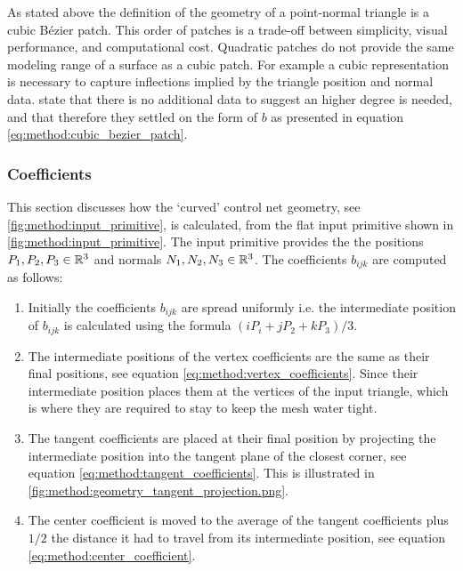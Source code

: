 As stated above the definition of the geometry of a point-normal triangle is a cubic Bézier patch. This order of patches is a trade-off between simplicity, visual performance, and computational cost. Quadratic patches do not provide the same modeling range of a surface as a cubic patch. For example a cubic representation is necessary to capture inflections implied by the triangle position and normal data. \citeauthor{vlachos2001curved} state that there is no additional data to suggest an higher degree is needed, and that therefore they settled on the form of $b$ as presented in equation \ref{eq:method:cubic_bezier_patch}.

\subsubsection{Coefficients} \label{sss:control_point_construction}
This section discusses how the `curved' control net geometry, see \cref{fig:method:input_primitive}, is calculated, from the flat input primitive shown in \cref{fig:method:input_primitive}. The input primitive provides the the positions $P_1, P_2, P_3 \in \mathbb{R}^3$ and normals $N_1, N_2, N_3 \in \mathbb{R}^3$. The coefficients $b_{ijk}$ are computed as follows:
%
\begin{enumerate}[label=(\roman*)]
	\item 
		Initially the coefficients $b_{ijk}$ are spread uniformly i.e. the intermediate position of $b_{ijk}$ is calculated using the formula $(i P_i + j P_2 + kP_3) / 3$. 
	\item 
		The intermediate positions of the vertex coefficients are the same as their final positions, see equation \eqref{eq:method:vertex_coefficients}. Since their intermediate position places them at the vertices of the input triangle, which is where they are required to stay to keep the mesh water tight.
	\item 
		The tangent coefficients are placed at their final position by projecting the intermediate position into the tangent plane of the closest corner, see equation \eqref{eq:method:tangent_coefficients}. This is illustrated in \cref{fig:method:geometry_tangent_projection.png}.
	\item The center coefficient is moved to the average of the tangent coefficients plus $1/2$ the distance it had to travel from its intermediate position, see equation \eqref{eq:method:center_coefficient}.
\end{enumerate}
%
